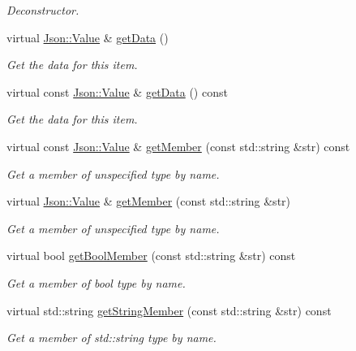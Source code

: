 \begin{DoxyCompactItemize}
\begin{DoxyCompactList}\small\item\em Deconstructor. \end{DoxyCompactList}\item 
virtual \hyperlink{class_json_1_1_value}{Json\-::\-Value} \& \hyperlink{class_a_w_e_1_1_media_item_ac3258f4f7f4557205b3906ff15c46612}{get\-Data} ()
\begin{DoxyCompactList}\small\item\em Get the data for this item. \end{DoxyCompactList}\item 
virtual const \hyperlink{class_json_1_1_value}{Json\-::\-Value} \& \hyperlink{class_a_w_e_1_1_media_item_abd79979e34b76f89d6cadabcb7886bd1}{get\-Data} () const 
\begin{DoxyCompactList}\small\item\em Get the data for this item. \end{DoxyCompactList}\item 
virtual const \hyperlink{class_json_1_1_value}{Json\-::\-Value} \& \hyperlink{class_a_w_e_1_1_media_item_a82bd831701d2a4c727ff505fbf9fbbb0}{get\-Member} (const std\-::string \&str) const 
\begin{DoxyCompactList}\small\item\em Get a member of unspecified type by name. \end{DoxyCompactList}\item 
virtual \hyperlink{class_json_1_1_value}{Json\-::\-Value} \& \hyperlink{class_a_w_e_1_1_media_item_a64bf0d84b75bd21dd27ef498c85bf695}{get\-Member} (const std\-::string \&str)
\begin{DoxyCompactList}\small\item\em Get a member of unspecified type by name. \end{DoxyCompactList}\item 
virtual bool \hyperlink{class_a_w_e_1_1_media_item_ad0beee6cac6524de24f5a1449502cdd5}{get\-Bool\-Member} (const std\-::string \&str) const 
\begin{DoxyCompactList}\small\item\em Get a member of {\ttfamily bool} type by name. \end{DoxyCompactList}\item 
virtual std\-::string \hyperlink{class_a_w_e_1_1_media_item_a86775a7b5252062953963840b3074568}{get\-String\-Member} (const std\-::string \&str) const 
\begin{DoxyCompactList}\small\item\em Get a member of {\ttfamily std\-::string} type by name. \end{DoxyCompactList}\item 

\end{DoxyCompactItemize}

